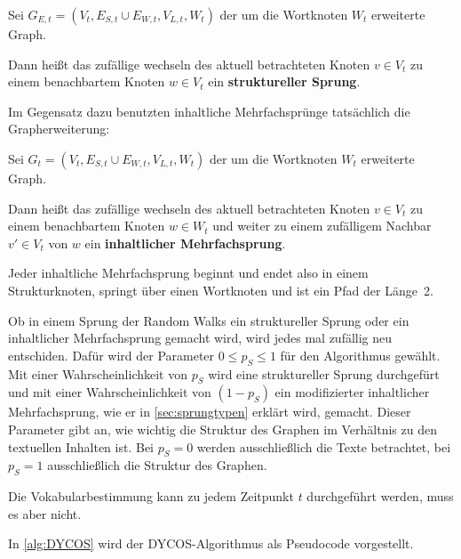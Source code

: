\begin{definition}
    Sei $G_{E,t} = (V_t, E_{S,t} \cup E_{W,t}, V_{L,t}, W_{t})$ der
    um die Wortknoten $W_{t}$ erweiterte Graph.

    Dann heißt das zufällige wechseln des aktuell betrachteten
    Knoten $v \in V_t$ zu einem benachbartem Knoten $w \in V_t$
    ein \textbf{struktureller Sprung}.
\end{definition}
\goodbreak
Im Gegensatz dazu benutzten inhaltliche Mehrfachsprünge
tatsächlich die Grapherweiterung:
\begin{definition}
    Sei $G_t = (V_t, E_{S,t} \cup E_{W,t}, V_{L,t}, W_{t})$ der
    um die Wortknoten $W_{t}$ erweiterte Graph.

    Dann heißt das zufällige wechseln des aktuell betrachteten
    Knoten $v \in V_t$ zu einem benachbartem Knoten $w \in W_t$
    und weiter zu einem zufälligem Nachbar $v' \in V_t$ von $w$
    ein \textbf{inhaltlicher Mehrfachsprung}.
\end{definition}

Jeder inhaltliche Mehrfachsprung beginnt und endet also in einem Strukturknoten,
springt über einen Wortknoten und ist ein Pfad der Länge~2.

Ob in einem Sprung der Random Walks ein struktureller Sprung oder
ein inhaltlicher Mehrfachsprung gemacht wird, wird jedes mal zufällig
neu entschiden. Dafür wird der Parameter $0 \leq p_S \leq 1$ für den Algorithmus 
gewählt. Mit einer Wahrscheinlichkeit von $p_S$ wird eine struktureller
Sprung durchgefürt und mit einer Wahrscheinlichkeit
von $(1-p_S)$ ein modifizierter inhaltlicher Mehrfachsprung, wie er in
\cref{sec:sprungtypen} erklärt wird, gemacht. Dieser 
Parameter gibt an, wie wichtig die Struktur des Graphen im Verhältnis
zu den textuellen Inhalten ist. Bei $p_S = 0$ werden ausschließlich
die Texte betrachtet, bei $p_S = 1$ ausschließlich die Struktur des
Graphen.

Die Vokabularbestimmung kann zu jedem Zeitpunkt $t$ durchgeführt 
werden, muss es aber nicht.

In \cref{alg:DYCOS} wird der DYCOS-Algorithmus als 
Pseudocode vorgestellt.

